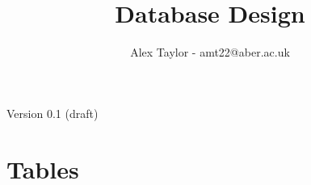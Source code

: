 \documentclass{article}
\title{Database Design}
\author{Alex Taylor - amt22@aber.ac.uk}
\begin{document}
\maketitle
\begin{center}
	Version 0.1 (draft)
\end{center}
\tableofcontents
\thispagestyle{empty}
\newpage

\section{Tables}
\newpage
\end{document}
